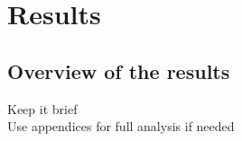 

\chapter{Results}
\label{chap:results}
\pagestyle{fancy}

\section{Overview of the results}
Keep it brief \\
Use appendices for full analysis if needed